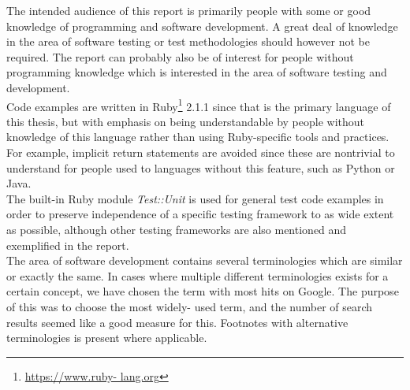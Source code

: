 
The intended audience of this report is primarily people with some or
good knowledge of programming and software development. A great deal of
knowledge in the area of software testing or test methodologies should
however not be required. The report can probably also be of interest for
people without programming knowledge which is interested in the area of
software testing and development.\\

Code examples are written in Ruby\footnote{\url{https://www.ruby-
lang.org}} 2.1.1 since that is the primary language of this thesis, but
with emphasis on being understandable by people without knowledge of
this language rather than using Ruby-specific tools and practices. For
example, implicit return statements are avoided since these are
nontrivial to understand for people used to languages without this
feature, such as Python or Java.\\

The built-in Ruby module \emph{Test::Unit} is used for general test code
examples in order to preserve independence of a specific testing
framework to as wide extent as possible, although other testing
frameworks are also mentioned and exemplified in the report.\\

The area of software development contains several terminologies which
are similar or exactly the same. In cases where multiple different
terminologies exists for a certain concept, we have chosen the term with
most hits on Google. The purpose of this was to choose the most widely-
used term, and the number of search results seemed like a good measure
for this. Footnotes with alternative terminologies is present where
applicable.\\
